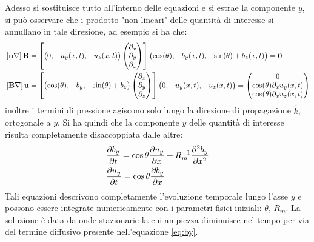 Adesso si sostituisce tutto all'interno delle equazioni e si estrae la componente $y$, si può osservare che i prodotto "non lineari" delle quantità di interesse si annullano in tale direzione, ad esempio si ha che:
\begin{align*}
     & \left[\vv{u}\nabla\right]\vv{B} =
    \left[\begin{pmatrix}
                  0, & u_y(x, t), & u_z(x, t)
              \end{pmatrix}
        \begin{pmatrix}
            \partial_x \\ \partial_y \\ \partial_z
        \end{pmatrix}\right]
    \begin{pmatrix}
        \cos(\theta), & b_{y}(x, t), & \sin(\theta) + b_{z}(x, t)
    \end{pmatrix} = \vv{0} \\
     & \left[\vv{B}\nabla\right]\vv{u} =
    \left[\begin{pmatrix}
                 \cos(\theta), & b_{y}, & \sin(\theta) + b_{z}
              \end{pmatrix}
        \begin{pmatrix}
            \partial_x \\ \partial_y \\ \partial_z
        \end{pmatrix}\right]\begin{pmatrix}
                            0, & u_{y}(x, t), & u_{z}(x, t)
                        \end{pmatrix}
    = \begin{pmatrix}
          0                                       \\
          \cos(\theta) \partial_x   u_y(x, t) \\
          \cos(\theta) \partial_x   u_z(x, t)
      \end{pmatrix}
\end{align*}
inoltre i termini di pressione agiscono solo lungo la direzione di propagazione $\hat{k}$, ortogonale a $y$. Si ha quindi che la componente $y$ delle quantità di interesse risulta completamente disaccoppiata dalle altre:
\begin{align}
     & \frac{\partial b_{y}}{\partial t}
    =
    \cos\theta \frac{\partial u_{y}}{\partial x}
    + R_m^{-1} \frac{\partial^2 b_{y}}{\partial x^2}   \label{eq:by}    \\
     & \frac{\partial u_{y}}{\partial t} = \cos\theta \frac{\partial b_y}{\partial x}
\end{align}
Tali equazioni descrivono completamente l'evoluzione temporale lungo l'asse $y$ e possono essere integrate numericamente con i parametri fisici iniziali: $\theta$, $R_m$. 
La soluzione è data da onde stazionarie la cui ampiezza diminuisce nel tempo per via del termine diffusivo presente nell'equazione \ref{eq:by}.


